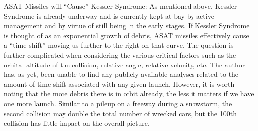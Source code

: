 ASAT Missiles will ``Cause'' Kessler Syndrome: As mentioned above,
Kessler Syndrome is already underway and is currently kept at bay by
active management and by virtue of still being in the early stages.
If Kessler Syndrome is thought of as an exponential growth of debris,
ASAT missiles effectively cause a ``time shift'' moving us further to
the right on that curve.  The question is further complicated when
considering the various critical factors such as the orbital altitude
of the collision, relative angle, relative velocity, etc.  The author
has, as yet, been unable to find any publicly available analyses
related to the amount of time-shift associated with any given launch.
However, it is worth noting that the more debris there is in orbit
already, the less it matters if we have one more launch.  Similar to a
pileup on a freeway during a snowstorm, the second collision may
double the total number of wrecked cars, but the 100th collision has
little impact on the overall picture.

